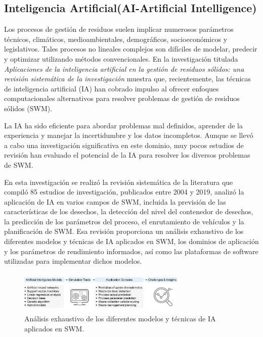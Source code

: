 \documentclass[10pt,journal]{IEEEtran}
\begin{document}
\subsection{\textbf{Inteligencia Artificial(AI-Artificial Intelligence)}}
Los procesos de gestión de residuos suelen implicar numerosos parámetros técnicos, climáticos, medioambientales, demográficos, socioeconómicos y legislativos. Tales procesos no lineales complejos son difíciles de modelar, predecir y optimizar utilizando métodos convencionales.
En la investigación titulada \textit{Aplicaciones de la inteligencia artificial en la gestión de residuos sólidos: una revisión sistemática de la investigación} \citep{artificial} muestra que, recientemente, las técnicas de inteligencia artificial (IA) han cobrado impulso al ofrecer enfoques computacionales alternativos para resolver problemas de gestión de residuos sólidos (SWM). \par La IA ha sido eficiente para abordar problemas mal definidos, aprender de la experiencia y manejar la incertidumbre y los datos incompletos. Aunque se llevó a cabo una investigación significativa en este dominio, muy pocos estudios de revisión han evaluado el potencial de la IA para resolver los diversos problemas de SWM. \par En esta investigación se realizó la revisión sistemática de la literatura que compiló 85 estudios de investigación, publicados entre 2004 y 2019, analizó la aplicación de IA en varios campos de SWM, incluida la previsión de las características de los desechos, la detección del nivel del contenedor de desechos, la predicción de los parámetros del proceso, el enrutamiento de vehículos y la planificación de SWM. Esa revisión proporciona un análisis exhaustivo de los diferentes modelos y técnicas de IA aplicados en SWM, los dominios de aplicación y los parámetros de rendimiento informados, así como las plataformas de software utilizadas para implementar dichos modelos.

\begin{figure}[H]
 \begin{center}
       \includegraphics[width=8cm, height=2cm]{figuras/4.JPG}
      \caption{Análisis exhaustivo de los diferentes modelos y técnicas de IA aplicados en SWM.}
      \label{f4} 
      \end{center}
\end{figure}
\end{document}
